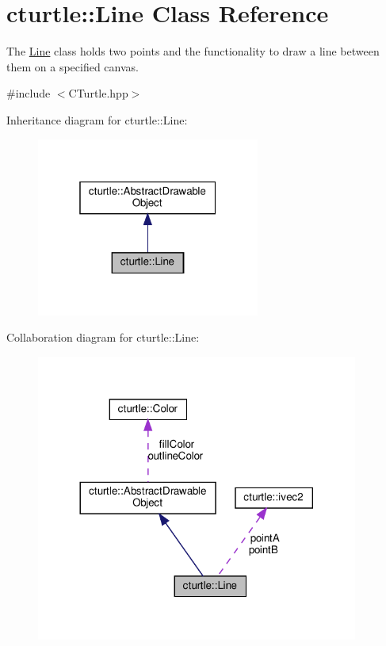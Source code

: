 \hypertarget{classcturtle_1_1Line}{}\section{cturtle\+:\+:Line Class Reference}
\label{classcturtle_1_1Line}


The \hyperlink{classcturtle_1_1Line}{Line} class holds two points and the functionality to draw a line between them on a specified canvas.  




{\ttfamily \#include $<$C\+Turtle.\+hpp$>$}



Inheritance diagram for cturtle\+:\+:Line\+:\nopagebreak
\begin{figure}[H]
\begin{center}
\leavevmode
\includegraphics[width=208pt]{classcturtle_1_1Line__inherit__graph}
\end{center}
\end{figure}


Collaboration diagram for cturtle\+:\+:Line\+:\nopagebreak
\begin{figure}[H]
\begin{center}
\leavevmode
\includegraphics[width=300pt]{classcturtle_1_1Line__coll__graph}
\end{center}
\end{figure}
